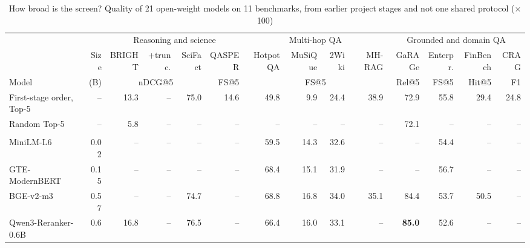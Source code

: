 \begin{table}[t]
\centering
\caption{How broad is the screen? Quality of 21 open-weight models on 11 benchmarks, from earlier project stages and not one shared protocol ($\times$100)}\label{tab:overview}
\scriptsize\setlength{\tabcolsep}{3.4pt}
\begin{tabular}{@{}l r rrrr rrrr rrrr@{}}\toprule
 & & \multicolumn{4}{c}{Reasoning and science} & \multicolumn{4}{c}{Multi-hop QA} & \multicolumn{4}{c}{Grounded and domain QA}\\\cmidrule(lr){3-6}\cmidrule(lr){7-10}\cmidrule(l){11-14}
 & Size & BRIGHT & +trunc. & SciFact & QASPER & HotpotQA & MuSiQue & 2Wiki & MH-RAG & GaRAGe & Enterpr. & FinBench & CRAG\\
Model & (B) & \multicolumn{3}{c}{nDCG@5} & FS@5 & \multicolumn{4}{c}{FS@5} & Rel@5 & FS@5 & Hit@5 & F1\\
\midrule
First-stage order, Top-5 & -- & 13.3 & \textcolor{black!30}{--} & 75.0 & 14.6 & 49.8 & 9.9 & 24.4 & 38.9 & 72.9 & 55.8 & 29.4 & 24.8\\
Random Top-5 & -- & 5.8 & \textcolor{black!30}{--} & \textcolor{black!30}{--} & \textcolor{black!30}{--} & \textcolor{black!30}{--} & \textcolor{black!30}{--} & \textcolor{black!30}{--} & \textcolor{black!30}{--} & 72.1 & \textcolor{black!30}{--} & \textcolor{black!30}{--} & \textcolor{black!30}{--}\\
\addlinespace[2pt]\multicolumn{14}{@{}l}{\textit{Dedicated rerankers (9)}}\\[1pt]
\quad MiniLM-L6~\cite{wang2020minilm} & 0.02 & \textcolor{black!30}{--} & \textcolor{black!30}{--} & \textcolor{black!30}{--} & \textcolor{black!30}{--} & 59.5 & 14.3 & 32.6 & \textcolor{black!30}{--} & \textcolor{black!30}{--} & 54.4 & \textcolor{black!30}{--} & \textcolor{black!30}{--}\\
\quad GTE-ModernBERT~\cite{zhang2024mgte} & 0.15 & \textcolor{black!30}{--} & \textcolor{black!30}{--} & \textcolor{black!30}{--} & \textcolor{black!30}{--} & 68.4 & 15.1 & 31.9 & \textcolor{black!30}{--} & \textcolor{black!30}{--} & 56.7 & \textcolor{black!30}{--} & \textcolor{black!30}{--}\\
\quad BGE-v2-m3~\cite{chen2024bgem3} & 0.57 & \textcolor{black!30}{--} & \textcolor{black!30}{--} & 74.7 & \textcolor{black!30}{--} & 68.8 & 16.8 & 34.0 & 35.1 & 84.4 & 53.7 & 50.5 & \textcolor{black!30}{--}\\
\quad Qwen3-Reranker-0.6B~\cite{zhang2025qwen3emb} & 0.6 & 16.8 & \textcolor{black!30}{--} & 76.5 & \textcolor{black!30}{--} & 66.4 & 16.0 & 33.1 & \textcolor{black!30}{--} & \textbf{85.0} & 52.6 & \textcolor{black!30}{--} & \textcolor{black!30}{--}\\

\end{tabular}
\end{table}

